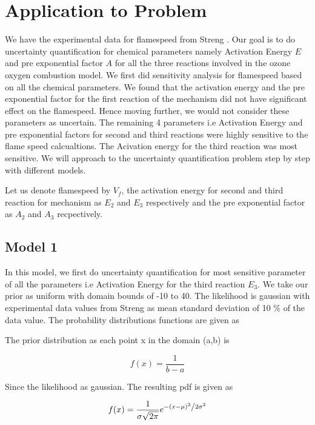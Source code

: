 \section{Application to Problem}

\noindent We have the experimental data for flamespeed from Streng \cite{Streng}. Our goal is to do uncertainty quantification for chemical parameters namely Activation Energy $ E $ and pre exponential factor $ A $ for all the three reactions involved in the ozone oxygen combustion model. We first did sensitivity analysis for flamespeed based on all the chemical parameters. We found that the activation energy and the pre exponential factor for the first reaction of the mechanism did not have significant effect on the flamespeed. Hence moving further, we would not consider these parameters as uncertain. The remaining 4 parameters i.e Activation Energy and pre exponential factors for second and third reactions were highly sensitive to the flame speed calcualtions. The Acivation energy for the third reaction was most sensitive. We will approach to the uncertainty quantification problem step by step with different models.  

\noindent Let us denote flamespeed by $V_f$, the activation energy for second and third reaction for mechanism as $E_2$ and $E_3$ respectively and the pre exponential factor as $A_2$ and $A_3$ recpectively. 


\subsection{Model 1}
\noindent In this model, we first do uncertainty quantification for most sensitive parameter of all the parameters i.e Activation Energy for the third reaction $E_3$. We take our prior as uniform with domain bounds of -10 to 40. The likelihood is gaussian with experimental data values from Streng\cite{Streng} as mean standard deviation of 10 \% of the data value. The probability distributions functions are given as

\noindent The prior distribution as each point x in the domain (a,b) is 

$$f(x) = \frac{1}{b -a}$$


\noindent Since the likelihood as gaussian. The resulting pdf is given as 

$$f(x) = \frac{1}{{\sigma \sqrt {2\pi } }}e^{{{ - \left( {x - \mu } \right)^2 } \mathord{\left/ {\vphantom {{ - \left( {x - \mu } \right)^2 } {2\sigma ^2 }}} \right. \kern-\nulldelimiterspace} {2\sigma ^2 }}} $$

